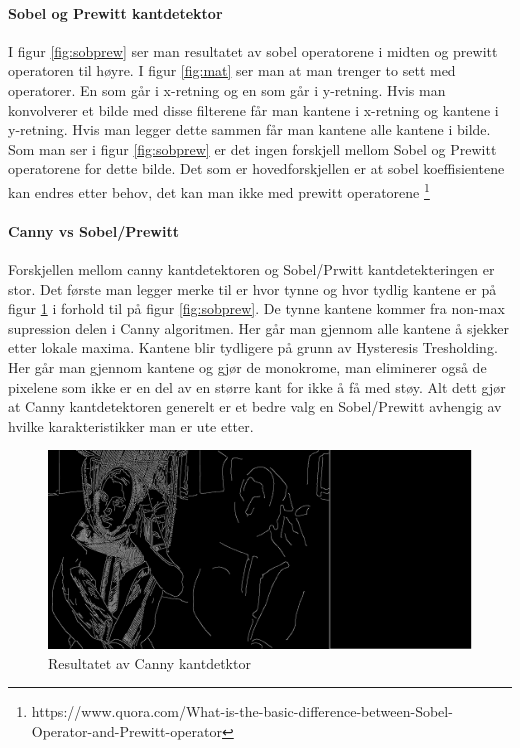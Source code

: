 \documentclass[a4paper, 12pt]{article}
\begin{document}
\paragraph{Sobel og Prewitt kantdetektor}
I figur \ref{fig:sobprew} ser man resultatet av sobel operatorene i midten og prewitt operatoren til høyre. I figur \ref{fig:mat} ser man at man trenger to sett med operatorer. En som går i x-retning og en som går i y-retning. Hvis man konvolverer et bilde med disse filterene får man kantene i x-retning og kantene i y-retning. Hvis man legger dette sammen får man kantene alle kantene i bilde.
Som man ser i figur \ref{fig:sobprew} er det ingen forskjell mellom Sobel og Prewitt operatorene for dette bilde. Det som er hovedforskjellen er at sobel koeffisientene kan endres etter behov, det kan man ikke med prewitt operatorene \footnote{https://www.quora.com/What-is-the-basic-difference-between-Sobel-Operator-and-Prewitt-operator}

\paragraph{Canny vs Sobel/Prewitt}
Forskjellen mellom canny kantdetektoren og Sobel/Prwitt kantdetekteringen er stor. Det første man legger merke til er hvor tynne og hvor tydlig kantene er på figur \ref{fig:canny} i forhold til på figur \ref{fig:sobprew}. De tynne kantene kommer fra non-max supression delen i Canny algoritmen. Her går man gjennom alle kantene å sjekker etter lokale maxima. Kantene blir tydligere på grunn av Hysteresis Tresholding. Her går man gjennom kantene og gjør de monokrome, man eliminerer også de pixelene som ikke er en del av en større kant for ikke å få med støy. Alt dett gjør at Canny kantdetektoren generelt er et bedre valg en Sobel/Prewitt avhengig av hvilke karakteristikker man er ute etter.


\begin{figure}[h]
  \centering
  \includegraphics[width=1.0\textwidth]{images/canny-edge-barbara}
  \caption{Resultatet av Canny kantdetktor}
  \label{fig:canny}
\end{figure}
\end{document}
